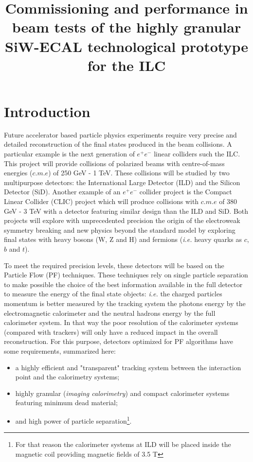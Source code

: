 \documentclass[a4paper,11pt]{article}
\title{\boldmath Commissioning and performance in beam tests of the highly granular SiW-ECAL technological prototype for the ILC}
\begin{document}
\maketitle
\flushbottom


\section{Introduction}

Future accelerator based particle physics experiments
require very precise and detailed reconstruction of the final states produced
in the beam collisions. A particular example is the next generation of $e^{+}e^{-}$
linear colliders such the ILC\cite{Behnke:2013xla,Baer:2013cma,Adolphsen:2013jya,Adolphsen:2013kya,Behnke:2013lya}.
This project will provide collisions of polarized beams with centre-of-mass energies ($c.m.e$) of 250 GeV - 1 TeV.
These collisions will be studied by two multipurpose detectors:
the International Large Detector (ILD) and the Silicon Detector (SiD)\cite{Behnke:2013lya}.
Another example of an $e^{+}e^{-}$ collider project is the Compact Linear Collider (CLIC)
project\cite{Aicheler:2012bya,Linssen:2012hp,Lebrun:2012hj}
which will produce collisions with $c.m.e$ of 380 GeV - 3 TeV
with a detector featuring similar design than the ILD and SiD.
Both projects will explore with unprecedented precision the origin of the electroweak symmetry breaking and new physics beyond the standard model by exploring final states with heavy bosons (W, Z  and H) and fermions ({\it i.e.} heavy quarks as $c$, $b$ and $t$).

To meet the required precision levels, these detectors will be based on the Particle Flow (PF) techniques\cite{Brient:2002gh,Morgunov:2004ed,Sefkow:2015hna}.
These techniques rely on single particle separation to make possible the choice of the best information available
in the full detector to measure the energy of the final state objects: {\it i.e.} the charged particles momentum is better measured by the tracking system
the photons energy by the electromagnetic calorimeter and the neutral hadrons energy by the full calorimeter system.
In that way the poor resolution of the calorimeter systems (compared with trackers) will  only have a reduced impact in the overall reconstruction.
For this purpose, detectors optimized for PF algorithms have some requirements, summarized here:

\begin{itemize}
\item a highly efficient and "transparent" tracking system between the interaction point and the calorimetry systems;
\item highly granular ({\it imaging calorimetry}) and compact calorimeter systems featuring minimum dead material;
\item and high power of particle separation\footnote{
For that reason the calorimeter systems at ILD will be placed inside the magnetic coil
providing magnetic fields of 3.5 T}.
\end{itemize}
\end{document}
